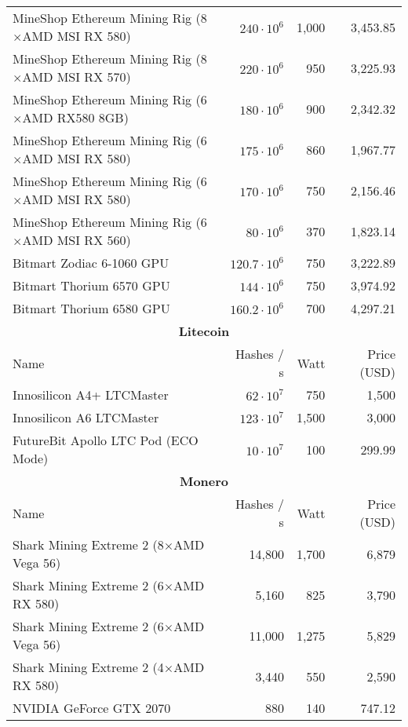 \begin{longtable}{|p{}|r|r|r|}
  MineShop Ethereum Mining Rig (8$\times$AMD MSI RX 580)        & $240 \cdot 10^6$ & 1,000 & 3,453.85 \\
  MineShop Ethereum Mining Rig (8$\times$AMD MSI RX 570)        & $220 \cdot 10^6$ & 950 & 3,225.93 \\
  MineShop Ethereum Mining Rig (6$\times$AMD RX580 8GB)         & $180 \cdot 10^6$ & 900 & 2,342.32 \\
  MineShop Ethereum Mining Rig (6$\times$AMD MSI RX 580)        & $175 \cdot 10^6$ & 860 & 1,967.77 \\
  MineShop Ethereum Mining Rig (6$\times$AMD MSI RX 580)        & $170 \cdot 10^6$ & 750 & 2,156.46 \\
  MineShop Ethereum Mining Rig (6$\times$AMD MSI RX 560)            & $ 80 \cdot 10^6$  & 370 & 1,823.14 \\
  Bitmart Zodiac 6-1060 GPU                                           & $120.7 \cdot 10^6$ & 750 & 3,222.89 \\
  Bitmart Thorium 6570 GPU                                            & $144 \cdot 10^6$ & 750 & 3,974.92 \\
  Bitmart Thorium 6580 GPU                                            & $160.2 \cdot 10^6$ & 700 & 4,297.21 \\
  \hline
  \multicolumn{4}{|c|}{\textbf{Litecoin}} \\
  \hline
  Name & Hashes / s & Watt & Price (USD)\\
  \hhline{|=|=|=|=|}
  Innosilicon A4+ LTCMaster           & $  62 \cdot 10^7$ & 750 & 1,500 \\
  Innosilicon A6 LTCMaster            & $ 123 \cdot 10^7$ & 1,500 & 3,000 \\
  FutureBit Apollo LTC Pod (ECO Mode) & $  10 \cdot 10^7$ & 100 & 299.99 \\
  \hline
  \multicolumn{4}{|c|}{\textbf{Monero}} \\
  \hline
  Name & Hashes / s & Watt & Price (USD)\\
  \hhline{|=|=|=|=|}
  Shark Mining Extreme 2 (8$\times$AMD Vega 56) & 14,800 & 1,700 & 6,879 \\
  Shark Mining Extreme 2 (6$\times$AMD RX 580) & 5,160 & 825 & 3,790 \\
  Shark Mining Extreme 2 (6$\times$AMD Vega 56) & 11,000 & 1,275 & 5,829 \\
  Shark Mining Extreme 2 (4$\times$AMD RX 580) & 3,440 & 550 & 2,590 \\
  NVIDIA GeForce GTX 2070 & 880 & 140 & 747.12 \\

\end{longtable}
